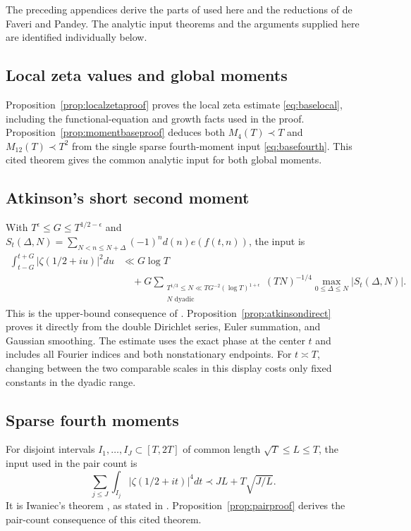 The preceding appendices derive the parts of \cite{B38} used here and
the reductions of de Faveri and Pandey. The analytic input theorems
and the arguments supplied here are identified individually below.

\subsection{Local zeta values and global moments}
Proposition~\ref{prop:localzetaproof} proves the local zeta estimate
\eqref{eq:baselocal}, including the functional-equation and growth
facts used in the proof. Proposition~\ref{prop:momentbaseproof} deduces
both $M_4(T)\prec T$ and $M_{12}(T)\prec T^2$ from the single sparse
fourth-moment input \eqref{eq:basefourth}. This cited theorem gives
the common analytic input for both global moments.

\subsection{Atkinson's short second moment}
With $T^\epsilon\le G\le T^{1/2-\epsilon}$ and
$S_t(\Delta,N)=\sum_{N<n\le N+\Delta}(-1)^nd(n)e(f(t,n))$, the input is
\begin{equation}\label{eq:baseatkinson}
 \begin{split}
 \int_{t-G}^{t+G}|\zeta(1/2+iu)|^2du
 &\ll G\log T\\
 &\quad+G\sum_{\substack{T^{1/3}\le N\ll T G^{-2}(\log T)^{1+\epsilon}\\
                         N\text{ dyadic}}}
 (TN)^{-1/4}\max_{0\le\Delta\le N}|S_t(\Delta,N)|.
 \end{split}
\end{equation}
This is the upper-bound consequence of \cite[Lemma 7.1]{dFP}.
Proposition~\ref{prop:atkinsondirect} proves it directly from the
double Dirichlet series, Euler summation, and Gaussian smoothing.
The estimate uses the exact phase at the center $t$ and includes all
Fourier indices and both nonstationary endpoints. For $t\asymp T$, changing
between the two comparable scales in this display costs only fixed
constants in the dyadic range.

\subsection{Sparse fourth moments}
For disjoint intervals $I_1,\ldots,I_J\subset[T,2T]$ of common length
$\sqrt T\le L\le T$, the input used in the pair count is
\begin{equation}\label{eq:basefourth}
 \sum_{j\le J}\int_{I_j}|\zeta(1/2+it)|^4dt
 \prec JL+T\sqrt{J/L}.
\end{equation}
It is Iwaniec's theorem \cite[Theorem~4]{Iwa80}, as stated in \cite[Proposition 8.1]{dFP}.
Proposition~\ref{prop:pairproof} derives the pair-count consequence
of this cited theorem.

